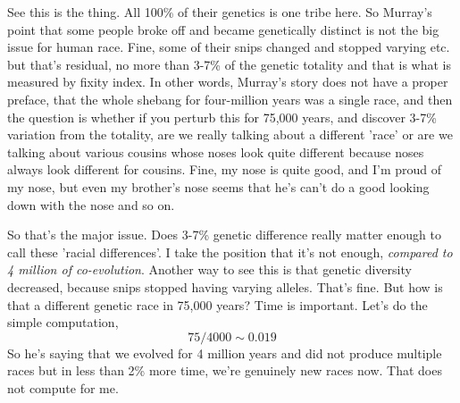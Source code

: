 \documentclass{amsart}
\begin{document}
See this is the thing.  All 100\% of their genetics is one tribe here.  So Murray's point that some people broke off and became genetically distinct is not the big issue for human race.  Fine, some of their snips changed and stopped varying etc. but that's residual, no more than 3-7\% of the genetic totality and that is what is measured by fixity index.  In other words, Murray's story does not have a proper preface, that the whole shebang for four-million years was a single race, and then the question is whether if you perturb this for 75,000 years, and discover 3-7\% variation from the totality, are we really talking about a different 'race' or are we talking about various cousins whose noses look quite different because noses always look different for cousins.  Fine, my nose is quite good, and I'm proud of my nose, but even my brother's nose seems that he's can't do a good looking down with the nose and so on.  

So that's the major issue.  Does 3-7\% genetic difference really matter enough to call these 'racial differences'.  I take the position that it's not enough, {\em compared to 4 million of co-evolution}.  Another way to see this is that genetic diversity decreased, because snips stopped having varying alleles.  That's fine.  But how is that a different genetic race in 75,000 years?  Time is important.  Let's do the simple computation, 
\[
75/4000 \sim 0.019
\]
So he's saying that we evolved for 4 million years and did not produce multiple races but in less than 2\% more time, we're genuinely new races now.  That does not compute for me.

 
\end{document}

